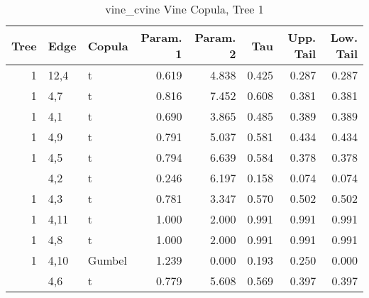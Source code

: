 \begin{table}

\caption{vine_cvine Vine Copula, Tree 1}
\centering
\begin{tabular}[t]{rllrrrrr}
\toprule
Tree & Edge & Copula & Param. 1 & Param. 2 & Tau & Upp. Tail & Low. Tail\\
\midrule
1 & 12,4 & t & 0.619 & 4.838 & 0.425 & 0.287 & 0.287\\
1 & 4,7 & t & 0.816 & 7.452 & 0.608 & 0.381 & 0.381\\
1 & 4,1 & t & 0.690 & 3.865 & 0.485 & 0.389 & 0.389\\
1 & 4,9 & t & 0.791 & 5.037 & 0.581 & 0.434 & 0.434\\
1 & 4,5 & t & 0.794 & 6.639 & 0.584 & 0.378 & 0.378\\
\addlinespace
1 & 4,2 & t & 0.246 & 6.197 & 0.158 & 0.074 & 0.074\\
1 & 4,3 & t & 0.781 & 3.347 & 0.570 & 0.502 & 0.502\\
1 & 4,11 & t & 1.000 & 2.000 & 0.991 & 0.991 & 0.991\\
1 & 4,8 & t & 1.000 & 2.000 & 0.991 & 0.991 & 0.991\\
1 & 4,10 & Gumbel & 1.239 & 0.000 & 0.193 & 0.250 & 0.000\\
\addlinespace
1 & 4,6 & t & 0.779 & 5.608 & 0.569 & 0.397 & 0.397\\
\bottomrule
\end{tabular}
\end{table}
